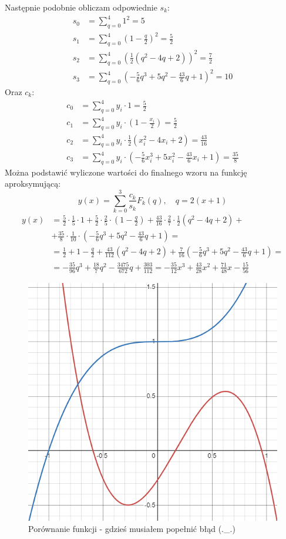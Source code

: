 \documentclass{article}
\begin{document}
\noindent
Następnie podobnie obliczam odpowiednie \(s_k\):
\begin{align*}
    s_0 &= \sum_{q=0}^4 1^2 = 5\\
    s_1 &= \sum_{q=0}^4 \left(1 - \frac{q}{2}\right)^2 = \frac{5}{2}\\
    s_2 &= \sum_{q=0}^4 \left(\frac{1}{2}(q^2 - 4q + 2)\right)^2 = \frac{7}{2}\\
    s_3 &= \sum_{q=0}^4 \left(-\frac{5}{6}q^3 + 5q^2 - \frac{43}{6}q + 1\right)^2 = 10
\end{align*}
Oraz \(c_k\):
\begin{align*}
    c_0 &= \sum_{q=0}^4 y_i \cdot 1 = \frac{5}{2}\\
    c_1 &= \sum_{q=0}^4 y_i \cdot \left(1 - \frac{x_i}{2}\right) = \frac{5}{2}\\
    c_2 &= \sum_{q=0}^4 y_i \cdot \frac{1}{2}(x_i^2 - 4x_i + 2) = \frac{43}{16}\\
    c_3 &= \sum_{q=0}^4 y_i \cdot \left(-\frac{5}{6}x_i^3 + 5x_i^2 - \frac{43}{6}x_i + 1\right) = \frac{35}{8}
\end{align*}
Można podstawić wyliczone wartości do finalnego wzoru na funkcję aproksymującą:
\[y(x) = \sum_{k=0}^3 \frac{c_k}{s_k} F_k(q), \quad q = 2(x+1)\]
\begin{align*}
    y(x) &= \frac{5}{2} \cdot \frac{1}{5} \cdot 1 + \frac{5}{2} \cdot \frac{2}{5} \cdot \left(1 - \frac{q}{2}\right) + \frac{43}{16} \cdot \frac{2}{7} \cdot \frac{1}{2}(q^2 - 4q + 2) +\\
    &+ \frac{35}{8} \cdot \frac{1}{10} \cdot \left(-\frac{5}{6}q^3 + 5q^2 - \frac{43}{6}q + 1\right) =\\
    &= \frac{1}{2} + 1 - \frac{q}{2} + \frac{43}{112}(q^2 - 4q + 2) + \frac{7}{16} \left(-\frac{5}{6}q^3 + 5q^2 - \frac{43}{6}q + 1\right) =\\
    &= -\frac{35}{96}q^3 + \frac{18}{7}q^2 - \frac{3475}{672}q + \frac{303}{112} = -\frac{35}{12}x^3 + \frac{43}{28}x^2 + \frac{71}{48}x - \frac{15}{56}
\end{align*}

\begin{figure}[H]
    \centering
    \includegraphics[width=0.48\linewidth]{graph3.png}
    \caption{Porównanie funkcji - gdzieś musiałem popełnić błąd (.\_.)}
\end{figure}
\end{document}
